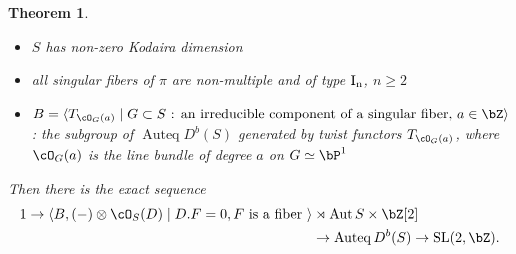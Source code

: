 \documentclass[a0,landscape]{a0poster}
\theoremstyle{plain}
\newtheorem{theorem}{Theorem}[section]
\theoremstyle{definition}
\DeclareMathOperator{\Auteq}{\mathrm{Auteq}}
\DeclareMathOperator{\Aut}{\mathrm{Aut}}
\DeclareMathOperator{\SL}{\mathrm{SL}}
\begin{document}
\begin{multicols}{3}
    \begin{tcolorbox}[
            colback = blue!10!white,
            colframe = blue!10!white,
            fonttitle = \bfseries,
            breakable = true]
        \begin{theorem}
            \quad
            \begin{itemize}
                \item $S$ has non-zero Kodaira dimension
                \item all singular fibers of $\pi$ are non-multiple and of type $\rm{I}_n$, $n \geq 2$
                \item  $B = \langle T_{\cO_G(a)} \mid G \subset S \text{ : an irreducible component of a singular fiber, } a \in \bZ \rangle$: the subgroup of $\Auteq D^b(S)$ generated by twist functors $T_{\cO_G(a)}$, where $\cO_G(a)$ is the line bundle of degree $a$ on $G \simeq \bP^1$
            \end{itemize}

            Then there is the exact sequence
            \begin{align*}
                1 \to \langle B, (-)\otimes \cO_S(D)\mid D.F=0, F \textrm{ is a fiber } \rangle & \rtimes \Aut{S} \times \bZ[2]      \\
                                                                                                & \to \Auteq{D^b(S)} \to \SL(2,\bZ).
            \end{align*}
        \end{theorem}
    \end{tcolorbox}



    \color{Green}

\end{multicols}
\end{document}
